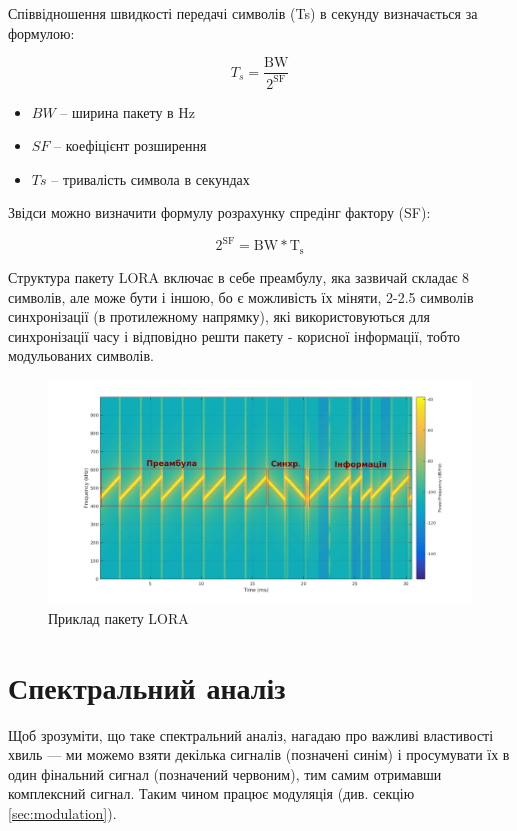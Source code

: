 \documentclass{article}
\begin{document}
Співвідношення швидкості передачі символів (Ts) в секунду визначається за формулою:

\[
T_s = \frac{\mathrm{BW}}{2^{\mathrm{SF}}}
\]

\begin{itemize}[noitemsep, topsep=8pt]
	\item ${BW}$ -- ширина пакету в Hz
	\item ${SF}$ -- коефіцієнт розширення  
	\item ${Ts}$ -- тривалість символа в секундах
\end{itemize}
Звідси можно визначити формулу розрахунку спредінг фактору (SF):

\[
{2^{\mathrm{SF}}} = {\mathrm{BW}}*{\mathrm{T_s}}
\]

Структура пакету LORA включає в себе преамбулу, яка зазвичай складає 8 символів, але може бути і іншою, бо є можливість їх міняти, 2-2.5 символів синхронізації (в протилежному напрямку), які використовуються для синхронізації часу і відповідно решти пакету - корисної інформації, тобто модульованих символів.

\begin{figure}[h!]
	\centering
	\includegraphics[width=0.8\linewidth]{images/lora_preambul.png}
	\caption{\label{fig:lora_preambul} Приклад пакету LORA}
\end{figure}


\newpage
\section{Спектральний аналіз}

Щоб зрозуміти, що таке спектральний аналіз, нагадаю про важливі властивості хвиль --- ми можемо взяти декілька сигналів (позначені синім) і просумувати їх в один фінальний сигнал (позначений червоним), тим самим отримавши комплексний сигнал. Таким чином працює модуляція (див. секцію \ref{sec:modulation}).
\end{document}
